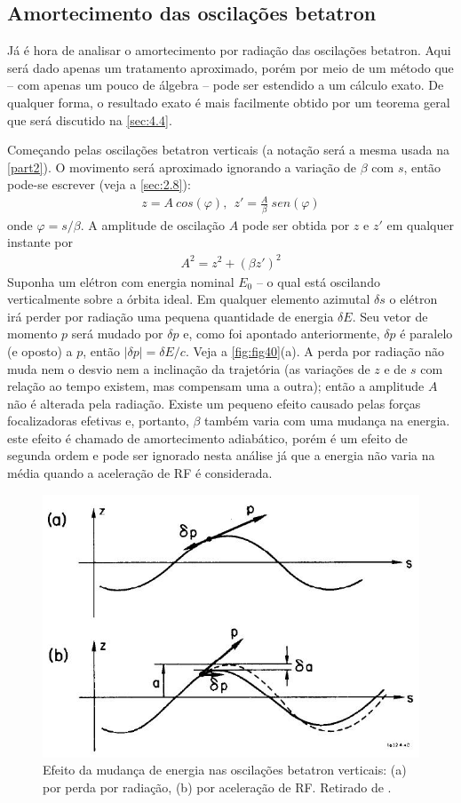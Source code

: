 \subsection{Amortecimento das oscilações betatron}
Já é hora de analisar o amortecimento por radiação das oscilações betatron. Aqui será dado apenas um tratamento aproximado, porém por meio de um método que -- com apenas um pouco de álgebra -- pode ser estendido a um cálculo exato. De qualquer forma, o resultado exato é mais facilmente obtido por um teorema geral que será discutido na \autoref{sec:4.4}.

Começando pelas oscilações betatron verticais (a notação será a mesma usada na \autoref{part2}). O movimento será aproximado ignorando a variação de $\beta$ com $s$, então pode-se escrever (veja a \autoref{sec:2.8}):
\begin{align}
	z = A\ cos(\varphi), \ \ z' = \frac{A}{\beta}\ sen(\varphi)\label{eq:4.24}
\end{align}
onde $\varphi = s/\beta$. A amplitude de oscilação $A$ pode ser obtida por $z$ e $z'$ em qualquer instante por
\begin{align}
	A^2 = z^2 + (\beta z')^2
\end{align}
Suponha um elétron com energia nominal $E_0$ -- o qual está oscilando verticalmente sobre a órbita ideal. Em qualquer elemento azimutal $\delta s$ o elétron irá perder por radiação uma pequena quantidade de energia $\delta E$. Seu vetor de momento $p$ será mudado por $\delta p$ e, como foi apontado anteriormente, $\delta p$ é paralelo (e oposto) a $p$, então $|\delta p| = \delta E/c$. Veja a \autoref{fig:fig40}(a). A perda por radiação não muda nem o desvio nem a inclinação da trajetória (as variações de $z$ e de $s$ com relação ao tempo existem, mas compensam uma a outra); então a amplitude $A$ não é alterada pela radiação. Existe um pequeno efeito causado pelas forças focalizadoras efetivas e, portanto, $\beta$ também varia com uma mudança na energia. este efeito é chamado de amortecimento adiabático, porém é um efeito de segunda ordem e pode ser ignorado nesta análise já que a energia não varia na média quando a aceleração de RF é considerada.

\begin{figure}[!htb]
	\centering
	\includegraphics[width=0.7\linewidth]{./Figuras/fig40.jpeg}
	\caption{Efeito da mudança de energia nas oscilações betatron verticais: (a) por perda por radiação, (b) por aceleração de RF. Retirado de \cite{sands1970physics}.}
	\label{fig:fig40}
\end{figure}

